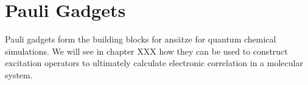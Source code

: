 \chapter{\label{pauli-gadgets}Pauli Gadgets}

Pauli gadgets form the building blocks for ansätze for quantum chemical simulations. We will see in chapter XXX how they can be used to construct excitation operators to ultimately calculate electronic correlation in a molecular system.
